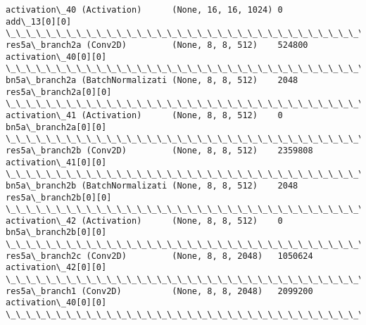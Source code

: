 \documentclass[11pt]{article}
\begin{document}
\begin{Verbatim}[commandchars=\\\{\}]
activation\_40 (Activation)      (None, 16, 16, 1024) 0           add\_13[0][0]                     
\_\_\_\_\_\_\_\_\_\_\_\_\_\_\_\_\_\_\_\_\_\_\_\_\_\_\_\_\_\_\_\_\_\_\_\_\_\_\_\_\_\_\_\_\_\_\_\_\_\_\_\_\_\_\_\_\_\_\_\_\_\_\_\_\_\_\_\_\_\_\_\_\_\_\_\_\_\_\_\_\_\_\_\_\_\_\_\_\_\_\_\_\_\_\_\_\_\_
res5a\_branch2a (Conv2D)         (None, 8, 8, 512)    524800      activation\_40[0][0]              
\_\_\_\_\_\_\_\_\_\_\_\_\_\_\_\_\_\_\_\_\_\_\_\_\_\_\_\_\_\_\_\_\_\_\_\_\_\_\_\_\_\_\_\_\_\_\_\_\_\_\_\_\_\_\_\_\_\_\_\_\_\_\_\_\_\_\_\_\_\_\_\_\_\_\_\_\_\_\_\_\_\_\_\_\_\_\_\_\_\_\_\_\_\_\_\_\_\_
bn5a\_branch2a (BatchNormalizati (None, 8, 8, 512)    2048        res5a\_branch2a[0][0]             
\_\_\_\_\_\_\_\_\_\_\_\_\_\_\_\_\_\_\_\_\_\_\_\_\_\_\_\_\_\_\_\_\_\_\_\_\_\_\_\_\_\_\_\_\_\_\_\_\_\_\_\_\_\_\_\_\_\_\_\_\_\_\_\_\_\_\_\_\_\_\_\_\_\_\_\_\_\_\_\_\_\_\_\_\_\_\_\_\_\_\_\_\_\_\_\_\_\_
activation\_41 (Activation)      (None, 8, 8, 512)    0           bn5a\_branch2a[0][0]              
\_\_\_\_\_\_\_\_\_\_\_\_\_\_\_\_\_\_\_\_\_\_\_\_\_\_\_\_\_\_\_\_\_\_\_\_\_\_\_\_\_\_\_\_\_\_\_\_\_\_\_\_\_\_\_\_\_\_\_\_\_\_\_\_\_\_\_\_\_\_\_\_\_\_\_\_\_\_\_\_\_\_\_\_\_\_\_\_\_\_\_\_\_\_\_\_\_\_
res5a\_branch2b (Conv2D)         (None, 8, 8, 512)    2359808     activation\_41[0][0]              
\_\_\_\_\_\_\_\_\_\_\_\_\_\_\_\_\_\_\_\_\_\_\_\_\_\_\_\_\_\_\_\_\_\_\_\_\_\_\_\_\_\_\_\_\_\_\_\_\_\_\_\_\_\_\_\_\_\_\_\_\_\_\_\_\_\_\_\_\_\_\_\_\_\_\_\_\_\_\_\_\_\_\_\_\_\_\_\_\_\_\_\_\_\_\_\_\_\_
bn5a\_branch2b (BatchNormalizati (None, 8, 8, 512)    2048        res5a\_branch2b[0][0]             
\_\_\_\_\_\_\_\_\_\_\_\_\_\_\_\_\_\_\_\_\_\_\_\_\_\_\_\_\_\_\_\_\_\_\_\_\_\_\_\_\_\_\_\_\_\_\_\_\_\_\_\_\_\_\_\_\_\_\_\_\_\_\_\_\_\_\_\_\_\_\_\_\_\_\_\_\_\_\_\_\_\_\_\_\_\_\_\_\_\_\_\_\_\_\_\_\_\_
activation\_42 (Activation)      (None, 8, 8, 512)    0           bn5a\_branch2b[0][0]              
\_\_\_\_\_\_\_\_\_\_\_\_\_\_\_\_\_\_\_\_\_\_\_\_\_\_\_\_\_\_\_\_\_\_\_\_\_\_\_\_\_\_\_\_\_\_\_\_\_\_\_\_\_\_\_\_\_\_\_\_\_\_\_\_\_\_\_\_\_\_\_\_\_\_\_\_\_\_\_\_\_\_\_\_\_\_\_\_\_\_\_\_\_\_\_\_\_\_
res5a\_branch2c (Conv2D)         (None, 8, 8, 2048)   1050624     activation\_42[0][0]              
\_\_\_\_\_\_\_\_\_\_\_\_\_\_\_\_\_\_\_\_\_\_\_\_\_\_\_\_\_\_\_\_\_\_\_\_\_\_\_\_\_\_\_\_\_\_\_\_\_\_\_\_\_\_\_\_\_\_\_\_\_\_\_\_\_\_\_\_\_\_\_\_\_\_\_\_\_\_\_\_\_\_\_\_\_\_\_\_\_\_\_\_\_\_\_\_\_\_
res5a\_branch1 (Conv2D)          (None, 8, 8, 2048)   2099200     activation\_40[0][0]              
\_\_\_\_\_\_\_\_\_\_\_\_\_\_\_\_\_\_\_\_\_\_\_\_\_\_\_\_\_\_\_\_\_\_\_\_\_\_\_\_\_\_\_\_\_\_\_\_\_\_\_\_\_\_\_\_\_\_\_\_\_\_\_\_\_\_\_\_\_\_\_\_\_\_\_\_\_\_\_\_\_\_\_\_\_\_\_\_\_\_\_\_\_\_\_\_\_\_

\end{Verbatim}
\end{document}
